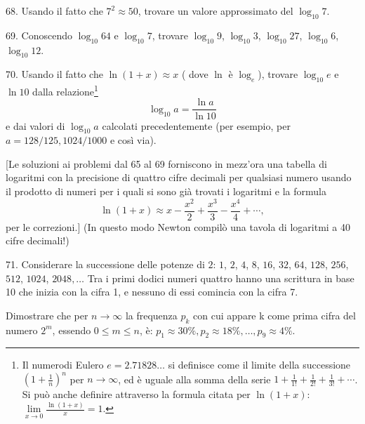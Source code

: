 \begin{problem}{68.} 
	Usando il fatto che $7^2 \approx 50$, trovare un valore approssimato del $\log_{10} 7$.
\end{problem}

\begin{problem}{69.}
	Conoscendo $\log_{10} 64$ e $\log_{10} 7$, trovare $\log_{10} 9$, $\log_{10} 3$,
    $\log_{10} 27$, $\log_{10} 6$, $\log_{10} 12$.
\end{problem}

\begin{problem}{70.}
	Usando il fatto che $\ln (1+x) \approx x$ ( dove $\ln$ è $\log_e$), trovare $\log_{10} e$ e
    $\ln 10$ dalla relazione\footnote{Il numerodi Eulero $e = 2{.}71828\dots$ si definisce come il limite della successione
	$\left(1+\frac{1}{n}\right)^n$ per $n\to \infty$, ed è uguale alla somma della serie
	$1+\frac{1}{1!} +\frac{1}{2!}+\frac{1}{3!}+\dotsb$. Si può anche definire attraverso la  formula citata per $\ln (1+x)$: $\lim\limits_{x\to 0}\frac{\ln(1+x)}{x} = 1$.}
	\begin{equation*}
		\log_{10} a=\frac{\ln a}{\ln 10}
	\end{equation*} 
	e dai valori di $\log_{10} a$ calcolati precedentemente (per esempio, per $a=128/125, 1024/1000$
	e così via).

	[Le soluzioni ai problemi dal  65 al 69 forniscono in mezz’ora una tabella di logaritmi con la precisione di quattro cifre decimali per qualsiasi numero usando il prodotto di numeri per i quali si sono già trovati i logaritmi e la formula
	\begin{equation*}
		\ln (1+x) \approx x-\frac{x^2}{2}+\frac{x^3}{3}-\frac{x^4}{4}+\dotsb,
	\end{equation*}
	per le correzioni.] (In  questo modo Newton compilò una tavola di logaritmi a 40 cifre decimali!)
\end{problem}

\begin{problem}{71.}
	Considerare la  successione delle potenze di $2$: $1$, $2$, $4$, $8$, $16$, $32$, $64$,
	$128$, $256$, $512$, $1024$, $2048, \dotsc$ Tra i primi dodici numeri quattro hanno una scrittura in base 10 che inizia con la cifra 1, e nessuno di essi comincia con la cifra 7.

	Dimostrare che per $n \to \infty$ la frequenza $p_{k}$ con cui appare k come prima cifra del numero $2^m$, essendo
	$0\leqslant m \leqslant n$, è:
	$p_1 \approx 30\%, p_2 \approx 18\%, \dotsc, p_9 \approx 4\%$.
\end{problem}

